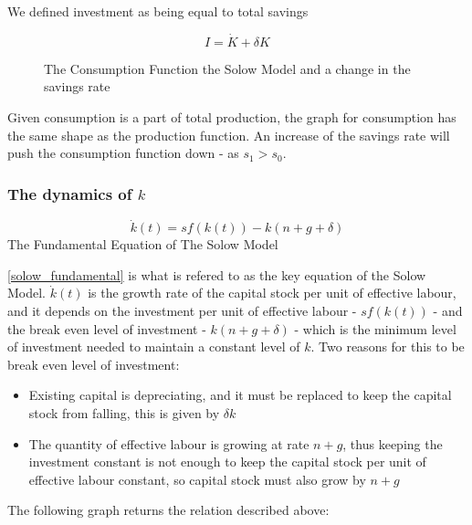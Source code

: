 We defined investment as being equal to total savings

\begin{equation}
I = \dot{K} + \delta K
\end{equation}
 
\begin{figure}[H]
\centering
{}
\caption{The Consumption Function the Solow Model and a change in the savings rate}
\end{figure}

Given consumption is a part of total production, the graph for consumption has the same shape as the production function. An increase of the savings rate will push the consumption function down - as $s_1 > s_0$.

\subsubsection*{The dynamics of $k$}
\begin{tcolorbox}[fontupper=\large, fontlower=\normalsize]
\begin{equation}\label{solow_fundamental}
    \dot{k}(t)=sf(k(t))-k(n+g+\delta)
\end{equation}
\tcblower
The Fundamental Equation of The Solow Model
\end{tcolorbox}

\ref{solow_fundamental} is what is refered to as the key equation of the Solow Model. $\dot{k}(t)$ is the growth rate of the capital stock per unit of effective labour, and it depends on the investment per unit of effective labour - $sf(k(t))$ - and the break even level of investment - $k(n+g+ \delta )$ - which is the minimum level of investment needed to maintain a constant level of $k$. Two reasons for this to be break even level of investment:
\begin{itemize}
    \item Existing capital is depreciating, and it must be replaced to keep the capital stock from falling, this is given by $\delta k$
    \item The quantity of effective labour is growing at rate $n+g$, thus keeping the investment constant is not enough to keep the capital stock per unit of effective labour constant, so capital stock must also grow by $n+g$
\end{itemize}
The following graph returns the relation described above:

